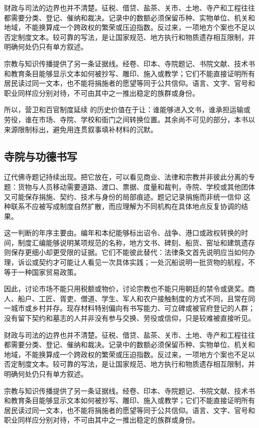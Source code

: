 财政与司法的边界也并不清楚。征税、借贷、盐茶、关市、土地、寺产和工程往往都需要分类、登记、催纳和裁决。记录中的数额必须保留币种、实物单位、机关和地域，不能换算成一个跨政权的繁荣或压迫指数。反过来，一项地方个案也不足以否定制度文本。较可靠的写法，是让国家规范、地方执行和物质遗存相互限制，并明确何处仍只有单方叙述。

宗教与知识传播提供了另一条证据线。经卷、印本、寺院题记、书院文献、技术书和教育条目能够显示文本如何被抄写、雕印、施入或教学；它们不能直接证明所有居民读过同一文本，也不能将捐施者的愿望等同于公共信仰。语言、文字、官号和职业同样应分别对待，不可由其中之一推出稳定的族群或身份。

所以，营卫和百官制度延续 的历史价值在于让：谁能够进入文书，谁承担运输或劳役，谁在市场、寺院、学校和衙门之间转换位置。其余尚不可见的部分，本书以来源限制标出，避免用连贯叙事填补材料的沉默。

\subsection{寺院与功德书写}

辽代佛寺题记持续出现。把它放在，可以看见商业、法律和宗教并非彼此分离的专题：货物与人员移动需要道路、渡口、票据、度量和裁判，寺院、学校或其他团体又可能保存捐施、契约、技术与身份的局部痕迹。题记记录捐施而非统一信仰 这种联系不应被写成制度自然扩散，而应理解为不同机构在具体地点反复协调的结果。

这一判断的年序主要由。编年和本纪能够标出诏令、战争、港口或政权转换的时间，制度汇编能够说明某项规范的名称，地方文书、碑刻、船货、窑址和建筑遗存则保存更细小却更受限的证据。它们不能彼此替代：法律条文首先说明应当如何办理，诉讼或契约才可能让人看见一次具体实践；一处沉船说明一批货物的航程，不等于一种国家贸易政策。

因此，讨论市场不能只用税额或物价，讨论宗教也不能只用朝廷的禁令或褒奖。商人、船户、工匠、胥吏、僧道、学生、军人和农户接触制度的方式不同，且常在同一城市或乡村并存。现存材料特别偏向有书写能力、可立碑或被官府登记的人群；没有留下契约和墓志的人并非没有参与交换、劳役或信仰，只是较难被直接听见。

财政与司法的边界也并不清楚。征税、借贷、盐茶、关市、土地、寺产和工程往往都需要分类、登记、催纳和裁决。记录中的数额必须保留币种、实物单位、机关和地域，不能换算成一个跨政权的繁荣或压迫指数。反过来，一项地方个案也不足以否定制度文本。较可靠的写法，是让国家规范、地方执行和物质遗存相互限制，并明确何处仍只有单方叙述。

宗教与知识传播提供了另一条证据线。经卷、印本、寺院题记、书院文献、技术书和教育条目能够显示文本如何被抄写、雕印、施入或教学；它们不能直接证明所有居民读过同一文本，也不能将捐施者的愿望等同于公共信仰。语言、文字、官号和职业同样应分别对待，不可由其中之一推出稳定的族群或身份。

